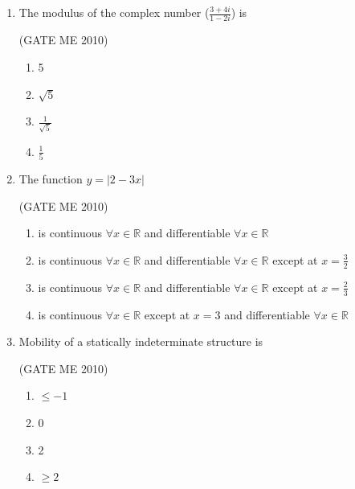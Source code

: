 \documentclass[journal,12pt,onecolumn]{IEEEtran}
\theoremstyle{remark}
\begin{document}
\begin{enumerate}
\hfill {}

\begin{multicols}{4}
\begin{enumerate}
    \item $-\pi$
    \item $-\pi/2$
    \item $-\pi/2$
    \item $\pi$
\end{enumerate}
\end{multicols}





\item  The modulus of the complex number ($\frac{3+4i}{1-2i}$) is

 \hfill{(GATE ME 2010)}
 
\begin{multicols}{4}
    \begin{enumerate}

        \item 5
        \item $\sqrt{5}$
        \item $\frac{1}{\sqrt{5}}$
        \item $\frac{1}{5}$
 \end{enumerate}
\end{multicols}


\item The function $y = |2 - 3x|$

 \hfill{(GATE ME 2010)}
 
\begin{enumerate}
\item is continuous $\forall x \in  \mathbb{R}$ and differentiable $\forall x \in \mathbb{R}$
\item is continuous $\forall x \in \mathbb{R}$ and differentiable $\forall x \in \mathbb{R}$ except at $x = \frac{3}{2}$
\item is continuous $\forall x \in \mathbb{R}$ and differentiable $\forall x \in \mathbb{R}$ except at $x = \frac{2}{3}$
\item is continuous $\forall x \in \mathbb{R}$ except at $x = 3$ and differentiable $\forall x \in \mathbb{R}$
\end{enumerate}

 
\item  Mobility of a statically indeterminate structure is 

 \hfill{(GATE ME 2010)}
\begin{multicols}{4}
\begin{enumerate}
\item $\le{-1}$
\item 0
\item 2 
\item $\ge{2}$
\end{enumerate}
\end{multicols}



\end{enumerate}
\end{document}
